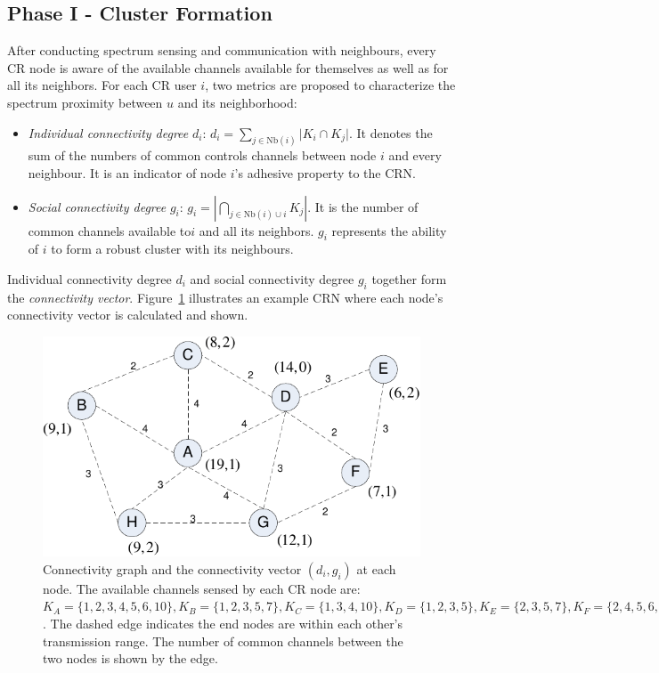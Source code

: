 \documentclass[10pt,journal,compsoc]{IEEEtran}
\theoremstyle{mytheoremstyle}
\theoremstyle{mytheoremstyle}
\theoremstyle{mytheoremstyle}
\begin{document}
\subsection{Phase I - Cluster Formation}
\label{phaseI}
After conducting spectrum sensing and communication with neighbours, every CR node is aware of the available channels available for themselves as well as for all its neighbors.
For each CR user $i$, two metrics are proposed to characterize the spectrum proximity between $u$ and its neighborhood:
\begin{itemize}

\item \textit{Individual connectivity degree} $d_i$: $d_i=\sum_{j\in \text{Nb}(i)}\vert K_i\cap K_j\vert$. It denotes the sum of the numbers of common controls channels between node $i$ and every neighbour.
It is an indicator of node $i$'s adhesive property to the CRN. 

\item \textit{Social connectivity degree} $g_i$: $g_i=|\bigcap_{j\in \text{Nb}(i)\cup i}K_j|$. It is the number of common channels available to$i$ and all its neighbors.
$g_i$ represents the ability of $i$ to form a robust cluster with its neighbours.
\end{itemize}
Individual connectivity degree $d_i$ and social connectivity degree $g_i$ together form the \textit{connectivity vector}.
Figure~\ref{fig1} illustrates an example CRN where each node's connectivity vector is calculated and shown.	
\begin{figure}[ht!]
  \centering
\includegraphics[width=0.7\linewidth]{figure1.pdf}
	\caption{Connectivity graph and the connectivity vector $(d_i, g_i)$ at each node. The available channels sensed by each CR node are: $K_A=\{1,2,3,4,5,6,10\}, K_B=\{1,2,3,5,7\}, K_C=\{1,3,4,10\}, K_D=\{1,2,3,5\}, K_E=\{2,3,5,7\}, K_F=\{2,4,5,6,7\}, K_G=\{1,2,3,4,8\}, K_H=\{1,2,5,8\}$. The dashed edge indicates the end nodes are within each other's transmission range. The number of common channels between the two nodes is shown by the edge.}
	\label{fig1}
\end{figure}
\end{document}
